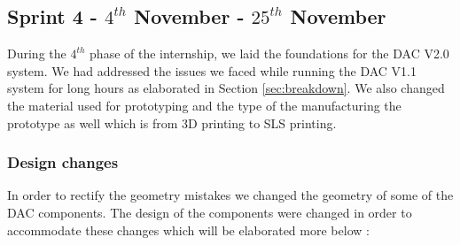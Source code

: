 \subsection{Sprint 4 - $4^{th}$ November - $25^{th}$ November}

During the $4^{th}$ phase of the internship, we laid the foundations for the DAC V2.0 system. We had addressed the issues we faced while running the DAC V1.1 system for long hours as elaborated in Section \ref{sec:breakdown}. We also changed the material used for prototyping and the type of the manufacturing the prototype as well which is from 3D printing to SLS printing. 

\subsubsection{Design changes}
In order to rectify the geometry mistakes we changed the geometry of some of the DAC components. The design of the components were changed in order to accommodate these changes which will be elaborated more below :

